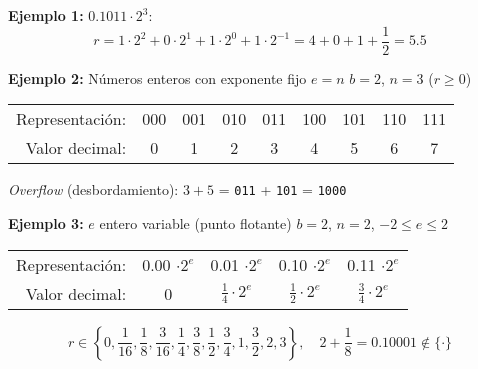 \documentclass[9pt, aspectratio=169]{beamer}
\begin{document}
\begin{frame}
  \textbf{Ejemplo 1:} $0.1011 \cdot 2^3$:
  \[ r = 1 \cdot 2^2 + 0 \cdot 2^1 + 1 \cdot 2^0 + 1 \cdot 2^{-1} = 4 + 0 + 1 + \frac{1}{2} = 5.5 \]
  \bigskip \pause

  \textbf{Ejemplo 2:} Números enteros con exponente fijo $e = n$ $b = 2$, $n = 3$ ($r \geq 0$)

  \begin{center}
    \begin{tabular}{rcccccccc}
      \toprule
      Representación: & 000 & 001 & 010 & 011 & 100 & 101 & 110 & 111 \\
      Valor decimal:  & 0   & 1   & 2   & 3   & 4   & 5   & 6   & 7   \\
      \bottomrule
    \end{tabular}
  \end{center}

  \textit{Overflow} (desbordamiento): $3 + 5$ = \texttt{011} +  \texttt{101} = \alert{\texttt{1000}}
  \bigskip \pause

  \textbf{Ejemplo 3:} $e$ entero variable (punto flotante) $b = 2$, $n = 2$, $-2 \leq e \leq 2$
  \begin{center}
    \begin{tabular}{rcccc}
      \toprule
      Representación: & 0.00 $\cdot 2^e$ & 0.01 $\cdot 2^e$        & 0.10 $\cdot 2^e$        & 0.11 $\cdot 2^e$        \\
      Valor decimal:  & 0                & $\frac{1}{4} \cdot 2^e$ & $\frac{1}{2} \cdot 2^e$ & $\frac{3}{4} \cdot 2^e$ \\
      \bottomrule
    \end{tabular}
  \end{center}
  \[ r \in \left\{0, \frac{1}{16}, \frac{1}{8}, \frac{3}{16}, \frac{1}{4}, \frac{3}{8}, \frac{1}{2}, \frac{3}{4}, 1, \frac{3}{2}, 2, 3 \right\}, \quad 2 + \frac{1}{8} = 0.10001 \notin \{ \cdot \} \]
\end{frame}
\end{document}
